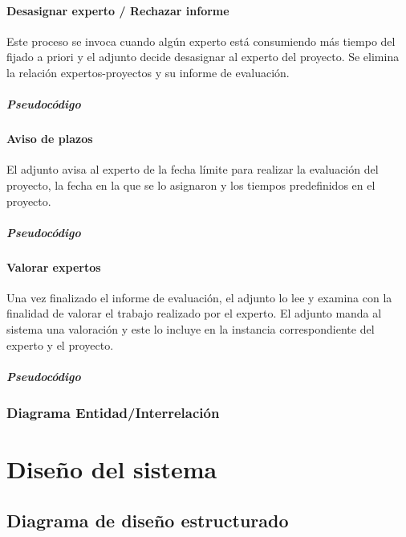 \documentclass[12pt,a4paper,spanish,twoside]{book}
\begin{document}
\subsection{Desasignar experto / Rechazar informe}
Este proceso se invoca cuando algún experto está consumiendo más tiempo del 
fijado a priori y el adjunto decide desasignar al experto del proyecto. Se 
elimina la relación expertos-proyectos y su informe de evaluación.

\subsubsection{Pseudocódigo}

\subsection{Aviso de plazos}
El adjunto avisa al experto de la fecha límite para realizar la evaluación del 
proyecto, la fecha en la que se lo asignaron y los tiempos predefinidos en el 
proyecto.

\subsubsection{Pseudocódigo}

\subsection{Valorar expertos}
Una vez finalizado el informe de evaluación, el adjunto lo lee y examina con la 
finalidad de valorar el trabajo realizado por el experto. El adjunto manda al
sistema una valoración y este lo incluye en la instancia correspondiente del 
experto y el proyecto.

\subsubsection{Pseudocódigo}

\section{Diagrama Entidad/Interrelación}

\part{Diseño del sistema}
\chapter{Diagrama de diseño estructurado}
\end{document}
